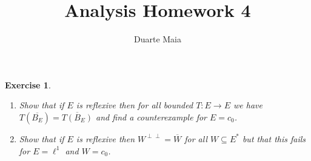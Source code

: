 \documentclass{article}
\title{Analysis Homework 4}
\author{Duarte Maia}
\newtheorem{ex}{Exercise}
\theoremstyle{nonumberplain}
\newcommand{\closed}[1]{\overline{#1}}
\begin{document}
\maketitle

\begin{ex}
\leavevmode
\begin{enumerate}
\item Show that if $E$ is reflexive then for all bounded $T \colon E \to E$ we have $T(\closed{B_E}) = \closed{T(B_E)}$ and find a counterexample for $E = c_0$.
\item Show that if $E$ is reflexive then $W^{\perp \perp} = \closed W$ for all $W \subseteq E^*$ but that this fails for $E = \ell^1$ and $W = c_0$.
\end{enumerate}
\end{ex}
\end{document}
